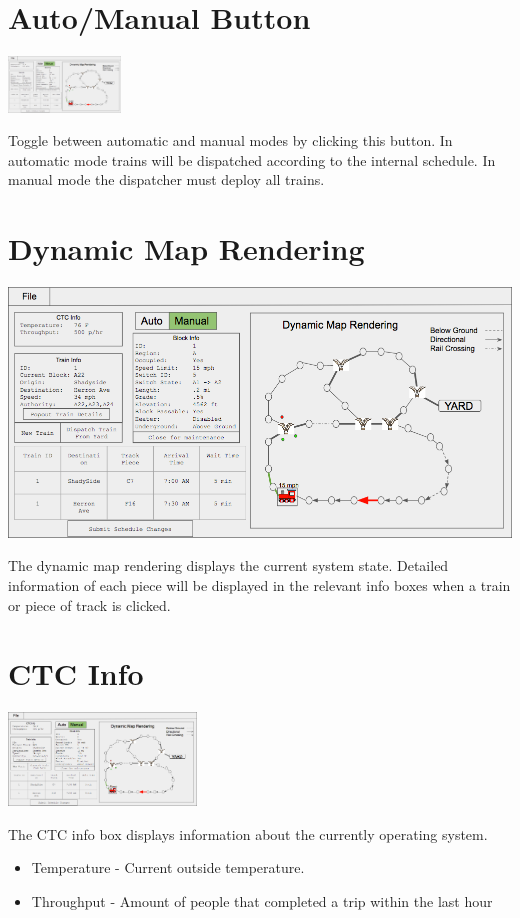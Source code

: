 \documentclass{scrreprt}
\begin{document}
\section{Auto/Manual Button}
\begin{center}
  \includegraphics[trim={9cm 14.65cm 20.8cm 1.7cm},clip,width=3cm]{CTC-main}
\end{center}
Toggle between automatic and manual modes by clicking this button. In automatic mode trains
will be dispatched according to the internal schedule. In manual mode the dispatcher must
deploy all trains.

\section{Dynamic Map Rendering}
\begin{center}
  \includegraphics[trim={17cm .65cm .5cm 1.75cm},clip,width=\textwidth]{CTC-main}
\end{center}
The dynamic map rendering displays the current system state. Detailed information of each
piece will be displayed in the relevant info boxes when a train or piece of track is clicked.

\section{CTC Info}
\begin{center}
  \includegraphics[trim={.45cm 13.5cm 27.45cm 1.7cm},clip,width=5cm]{CTC-main}
\end{center}
The CTC info box displays information about the currently operating system.
\begin{itemize}
  \item Temperature - Current outside temperature.
  \item Throughput - Amount of people that completed a trip within the last hour
\end{itemize}
\end{document}
